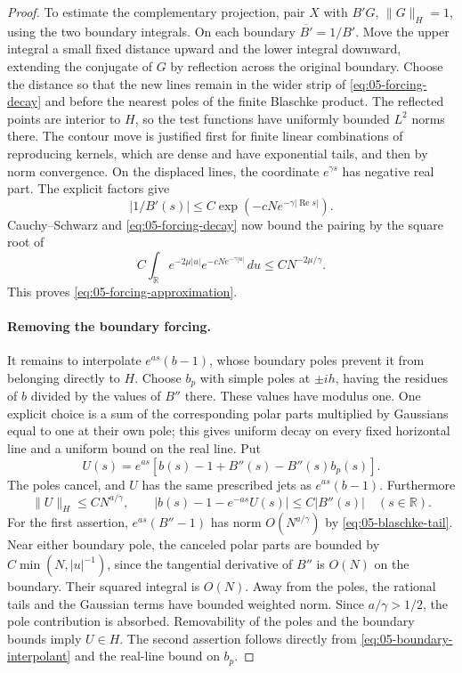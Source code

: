 \begin{proof}
To estimate the complementary projection, pair \(X\) with \(B'G\), \(\|G\|_H=1\), using the two boundary integrals. On each boundary \(\overline{B'}=1/B'\). Move the upper integral a small fixed distance upward and the lower integral downward, extending the conjugate of \(G\) by reflection across the original boundary. Choose the distance so that the new lines remain in the wider strip of \eqref{eq:05-forcing-decay} and before the nearest poles of the finite Blaschke product. The reflected points are interior to \(H\), so the test functions have uniformly bounded \(L^2\) norms there. The contour move is justified first for finite linear combinations of reproducing kernels, which are dense and have exponential tails, and then by norm convergence. On the displaced lines, the coordinate \(e^{\gamma s}\) has negative real part. The explicit factors give
\[
 |1/B'(s)|\le C\exp(-cN e^{-\gamma|\operatorname{Re}s|}).
\]
Cauchy--Schwarz and \eqref{eq:05-forcing-decay} now bound the pairing by the square root of
\[
 C\int_{\mathbb R}e^{-2\mu|u|}
                  e^{-cN e^{-\gamma|u|}}\,du
 \le C N^{-2\mu/\gamma}.
\]
This proves \eqref{eq:05-forcing-approximation}.

\paragraph{Removing the boundary forcing.}
It remains to interpolate \(e^{as}(b-1)\), whose boundary poles prevent it from belonging directly to \(H\). Choose \(b_p\) with simple poles at \(\pm ih\), having the residues of \(b\) divided by the values of \(B''\) there. These values have modulus one. One explicit choice is a sum of the corresponding polar parts multiplied by Gaussians equal to one at their own pole; this gives uniform decay on every fixed horizontal line and a uniform bound on the real line. Put
\begin{equation}
 U(s)=e^{as}[b(s)-1+B''(s)-B''(s)b_p(s)].
 \label{eq:05-boundary-interpolant}
\end{equation}
The poles cancel, and \(U\) has the same prescribed jets as \(e^{as}(b-1)\). Furthermore
\begin{equation}
 \|U\|_H\le C N^{a/\gamma},\qquad
 |b(s)-1-e^{-as}U(s)|\le C|B''(s)|\quad(s\in\mathbb R).
 \label{eq:05-boundary-interpolant-bound}
\end{equation}
For the first assertion, \(e^{as}(B''-1)\) has norm \(O(N^{a/\gamma})\) by \eqref{eq:05-blaschke-tail}. Near either boundary pole, the canceled polar parts are bounded by
\(C\min(N,|u|^{-1})\), since the tangential derivative of \(B''\) is \(O(N)\) on the boundary. Their squared integral is \(O(N)\). Away from the poles, the rational tails and the Gaussian terms have bounded weighted norm. Since \(a/\gamma>1/2\), the pole contribution is absorbed. Removability of the poles and the boundary bounds imply \(U\in H\). The second assertion follows directly from \eqref{eq:05-boundary-interpolant} and the real-line bound on \(b_p\).


\end{proof}
